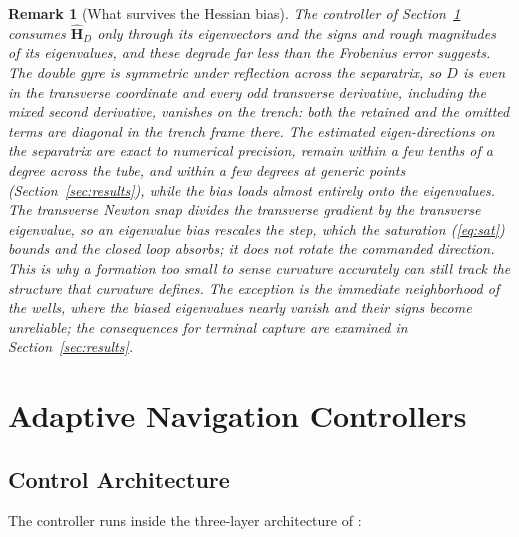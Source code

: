 \documentclass[lettersize,journal]{IEEEtran}
\newtheorem{remark}{Remark}
\begin{document}
\begin{remark}[What survives the Hessian bias]
\label{rem:eigvec}
The controller of Section~\ref{sec:controllers} consumes
$\hat{\mathbf{H}}_D$ only through its eigenvectors and the signs and
rough magnitudes of its eigenvalues, and these degrade far less than the
Frobenius error suggests. The double gyre is symmetric under reflection
across the separatrix, so $D$ is even in the transverse coordinate and
every odd transverse derivative, including the mixed second derivative,
vanishes on the trench: both the retained and the omitted terms are
diagonal in the trench frame there. The estimated eigen-directions on
the separatrix are exact to numerical precision, remain within a few
tenths of a degree across the tube, and within a few degrees at generic
points (Section~\ref{sec:results}), while the bias loads almost entirely
onto the eigenvalues. The transverse Newton snap divides the transverse
gradient by the transverse eigenvalue, so an eigenvalue bias rescales
the step, which the saturation (\ref{eq:sat}) bounds and the closed loop
absorbs; it does not rotate the commanded direction. This is why a
formation too small to sense curvature accurately can still track the
structure that curvature defines. The exception is the immediate
neighborhood of the wells, where the biased eigenvalues nearly vanish
and their signs become unreliable; the consequences for terminal capture
are examined in Section~\ref{sec:results}.
\end{remark}


\section{Adaptive Navigation Controllers}
\label{sec:controllers}

\subsection{Control Architecture}
\label{sec:arch}

The controller runs inside the three-layer architecture of \cite{14,30}:
\end{document}

